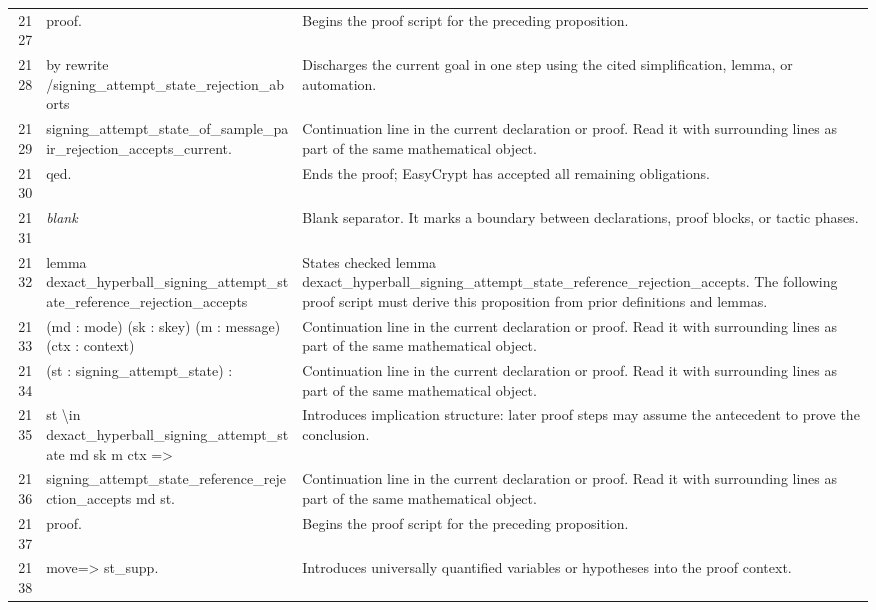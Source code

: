 \documentclass[10pt]{article}
\begin{document}
\begin{longtable}{r L{0.53\textwidth} L{0.37\textwidth}}
2127 & {\ttfamily\scriptsize proof.} & Begins the proof script for the preceding proposition. \\
2128 & {\ttfamily\scriptsize by rewrite /signing\_attempt\_state\_rejection\_aborts} & Discharges the current goal in one step using the cited simplification, lemma, or automation. \\
2129 & {\ttfamily\scriptsize            signing\_attempt\_state\_of\_sample\_pair\_rejection\_accepts\_current.} & Continuation line in the current declaration or proof.  Read it with surrounding lines as part of the same mathematical object. \\
2130 & {\ttfamily\scriptsize qed.} & Ends the proof; EasyCrypt has accepted all remaining obligations. \\
2131 & {\ttfamily\scriptsize \emph{blank}} & Blank separator.  It marks a boundary between declarations, proof blocks, or tactic phases. \\
2132 & {\ttfamily\scriptsize lemma dexact\_hyperball\_signing\_attempt\_state\_reference\_rejection\_accepts} & States checked lemma dexact\_hyperball\_signing\_attempt\_state\_reference\_rejection\_accepts.  The following proof script must derive this proposition from prior definitions and lemmas. \\
2133 & {\ttfamily\scriptsize    (md : mode) (sk : skey) (m : message) (ctx : context)} & Continuation line in the current declaration or proof.  Read it with surrounding lines as part of the same mathematical object. \\
2134 & {\ttfamily\scriptsize    (st : signing\_attempt\_state) :} & Continuation line in the current declaration or proof.  Read it with surrounding lines as part of the same mathematical object. \\
2135 & {\ttfamily\scriptsize   st \textbackslash{}in dexact\_hyperball\_signing\_attempt\_state md sk m ctx =>} & Introduces implication structure: later proof steps may assume the antecedent to prove the conclusion. \\
2136 & {\ttfamily\scriptsize   signing\_attempt\_state\_reference\_rejection\_accepts md st.} & Continuation line in the current declaration or proof.  Read it with surrounding lines as part of the same mathematical object. \\
2137 & {\ttfamily\scriptsize proof.} & Begins the proof script for the preceding proposition. \\
2138 & {\ttfamily\scriptsize move=> st\_supp.} & Introduces universally quantified variables or hypotheses into the proof context. \\

\end{longtable}
\end{document}
